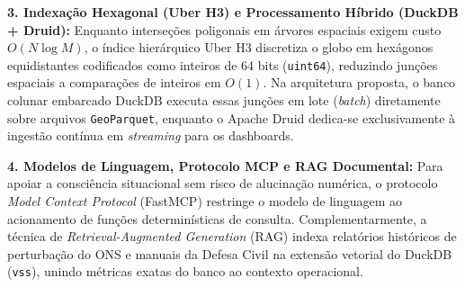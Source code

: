 \textbf{3. Indexação Hexagonal (Uber H3) e Processamento Híbrido (DuckDB + Druid):} Enquanto interseções poligonais em árvores espaciais exigem custo $O(N \log M)$, o índice hierárquico Uber H3 \cite{uber_h3_2018} discretiza o globo em hexágonos equidistantes codificados como inteiros de 64 bits (\texttt{uint64}), reduzindo junções espaciais a comparações de inteiros em $O(1)$. Na arquitetura proposta, o banco colunar embarcado DuckDB \cite{raasveldt2019duckdb} executa essas junções em lote (\textit{batch}) diretamente sobre arquivos \texttt{GeoParquet}, enquanto o Apache Druid \cite{yang2014druid} dedica-se exclusivamente à ingestão contínua em \textit{streaming} para os dashboards.

\textbf{4. Modelos de Linguagem, Protocolo MCP e RAG Documental:} Para apoiar a consciência situacional \cite{endsley1995toward} sem risco de alucinação numérica, o protocolo \textit{Model Context Protocol} (FastMCP) \cite{anthropic2024mcp} restringe o modelo de linguagem ao acionamento de funções determinísticas de consulta. Complementarmente, a técnica de \textit{Retrieval-Augmented Generation} (RAG) indexa relatórios históricos de perturbação do ONS e manuais da Defesa Civil na extensão vetorial do DuckDB (\texttt{vss}), unindo métricas exatas do banco ao contexto operacional.

